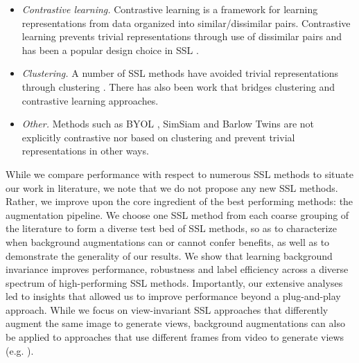 \documentclass[twoside,11pt]{article}
\begin{document}
\begin{itemize}[leftmargin=2em]
    \itemsep0em 
    \item  \textit{Contrastive learning.} Contrastive learning \citep{hadsell_dimensionality_2006} is a framework for learning representations from data organized into similar/dissimilar pairs. Contrastive learning prevents trivial representations through use of dissimilar pairs and has been a popular design choice in SSL \citep{he2019moco, chen2020mocov2, chen2020simple, chen2020big, wu_unsupervised_2018, infonce_2018, hjelm_learning_2019, ye_unsupervised_2019, henaff_data-efficient_2020, bachman_learning_2019, tian_contrastive_2020, misra2020pirl, dosovitskiy_discriminative_2014, fnc}. 
    
     \item \textit{Clustering.} A number of SSL methods have avoided trivial representations through clustering \citep{asano_self-labelling_2020, caron_deep_2018, caron_unsupervised_2019, swav, ji_invariant_2019}. There has also been work \citep{li_prototypical_2021, zhuang_local_2019} that bridges clustering and contrastive learning approaches.
     
     \item \textit{Other.} Methods such as BYOL \citep{grill2020bootstrap}, SimSiam \citep{simsiam} and Barlow Twins \citep{zbontar_barlow_2021} are not explicitly contrastive nor based on clustering and prevent trivial representations in other ways.
\end{itemize}

While we compare performance with respect to numerous SSL methods to situate our work in literature, we note that we do not propose any new SSL methods. Rather, we improve upon the core ingredient of the best performing methods: the augmentation pipeline. We choose one SSL method from each coarse grouping of the literature to form a diverse test bed of SSL methods, so as to characterize when background augmentations can or cannot confer benefits, as well as to demonstrate the generality of our results. We show that learning background invariance improves performance, robustness and label efficiency across a diverse spectrum of high-performing SSL methods. Importantly, our extensive analyses led to insights that allowed us to improve performance beyond a plug-and-play approach. While we focus on view-invariant SSL approaches that differently augment the same image to generate views, background augmentations can also be applied to approaches that use different frames from video to generate views (e.g. \citet{zhuang_unsupervised_2020, sermanet_time-contrastive_2018, gordon_watching_2020, han_video_2019}).
\end{document}
